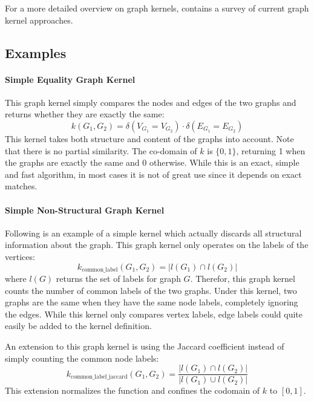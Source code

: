 For a more detailed overview on graph kernels, \cite{Gartner2003a} contains a survey of current graph kernel approaches.

\subsection{Examples}
\paragraph{Simple Equality Graph Kernel}
This graph kernel simply compares the nodes and edges of the two graphs and returns whether they are exactly the same:
\begin{equation*}
    k(G_1, G_2) = \delta(V_{G_1} = V_{G_2}) \cdot \delta(E_{G_1} = E_{G_2})
\end{equation*}
This kernel takes both structure and content of the graphs into account. Note that there is no partial similarity. The co-domain of $k$ is $\{0, 1\}$, returning 1 when the graphs are exactly the same and 0 otherwise.
While this is an exact, simple and fast algorithm, in most cases it is not of great use since it depends on exact matches.

\paragraph{Simple Non-Structural Graph Kernel}
Following is an example of a simple kernel which actually discards all structural information about the graph. This graph kernel only operates on the labels of the vertices:
\begin{equation*}
k_{\mathrm{common\_label}}(G_1, G_2) = | l(G_1) \cap l(G_2) |
\end{equation*}
where $l(G)$ returns the set of labels for graph $G$.
Therefor, this graph kernel counts the number of common labels of the two graphs. Under this kernel, two graphs are the same when they have the same node labels, completely ignoring the edges.
While this kernel only compares vertex labels, edge labels could quite easily be added to the kernel definition.

An extension to this graph kernel is using the Jaccard coefficient instead of simply counting the common node labels:
\begin{equation*}
k_{\mathrm{common\_label\_jaccard}}(G_1, G_2) = \frac{| l(G_1) \cap l(G_2) |}{| l(G_1) \cup l(G_2) |}
\end{equation*}
This extension normalizes the function and confines the codomain of $k$ to $[0, 1]$.

